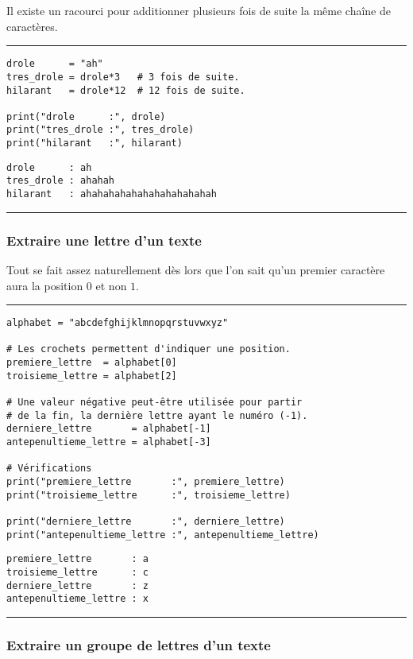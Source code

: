 Il existe un racourci pour additionner plusieurs fois de suite la même chaîne de caractères.


\bigskip
{\hrule height .5mm}
\begin{verbatim}
drole      = "ah"
tres_drole = drole*3   # 3 fois de suite.
hilarant   = drole*12  # 12 fois de suite.

print("drole      :", drole)
print("tres_drole :", tres_drole)
print("hilarant   :", hilarant)
\end{verbatim}
 \color{ForestGreen}
\vspace{-1.5em}
\begin{verbatim}
drole      : ah
tres_drole : ahahah
hilarant   : ahahahahahahahahahahahah
\end{verbatim} \color{Black}
{\hrule height .5mm}
\bigskip


\subsubsection{Extraire une lettre d'un texte}

Tout se fait assez naturellement dès lors que l'on sait qu'un premier caractère aura la position $0$ et non $1$.


\bigskip
{\hrule height .5mm}
\begin{verbatim}
alphabet = "abcdefghijklmnopqrstuvwxyz"

# Les crochets permettent d'indiquer une position.
premiere_lettre  = alphabet[0]
troisieme_lettre = alphabet[2]

# Une valeur négative peut-être utilisée pour partir
# de la fin, la dernière lettre ayant le numéro (-1).
derniere_lettre       = alphabet[-1]
antepenultieme_lettre = alphabet[-3]

# Vérifications
print("premiere_lettre       :", premiere_lettre)
print("troisieme_lettre      :", troisieme_lettre)

print("derniere_lettre       :", derniere_lettre)
print("antepenultieme_lettre :", antepenultieme_lettre)
\end{verbatim}
 \color{ForestGreen}
\vspace{-1.5em}
\begin{verbatim}
premiere_lettre       : a
troisieme_lettre      : c
derniere_lettre       : z
antepenultieme_lettre : x
\end{verbatim} \color{Black}
{\hrule height .5mm}
\bigskip


\subsubsection{Extraire un groupe de lettres d'un texte}

